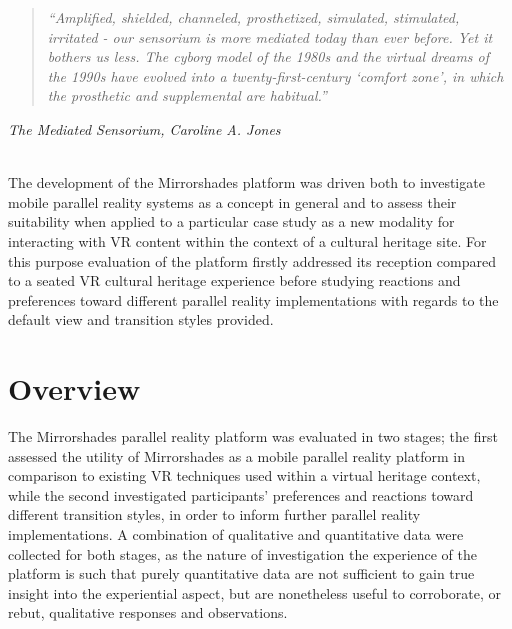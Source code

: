\begin{quote}
	\textit{``Amplified, shielded, channeled, prosthetized, simulated, stimulated, irritated - our sensorium is more mediated today than ever before. Yet it bothers us less. The cyborg model of the 1980s and the virtual dreams of the 1990s have evolved into a twenty-first-century `comfort zone', in which the prosthetic and supplemental are habitual.''}
\end{quote}
\hfill \textit{The Mediated Sensorium, Caroline A. Jones}
\\
\\


\label{chapter-eval-1}

The development of the Mirrorshades platform was driven both to investigate mobile parallel reality systems as a concept in general and to assess their suitability when applied to a particular case study as a new modality for interacting with VR content within the context of a cultural heritage site. For this purpose evaluation of the platform firstly addressed its reception compared to a seated VR cultural heritage experience before studying reactions and preferences toward different parallel reality implementations with regards to the default view and transition styles provided.




\section{Overview}

The Mirrorshades parallel reality platform was evaluated in two stages; the first assessed the utility of Mirrorshades as a mobile parallel reality platform in comparison to existing VR techniques used within a virtual heritage context, while the second investigated participants' preferences and reactions toward different transition styles, in order to inform further parallel reality implementations. A combination of qualitative and quantitative data were collected for both stages, as the nature of investigation the experience of the platform is such that purely quantitative data are not sufficient to gain true insight into the experiential aspect, but are nonetheless useful to corroborate, or rebut, qualitative responses and observations.

